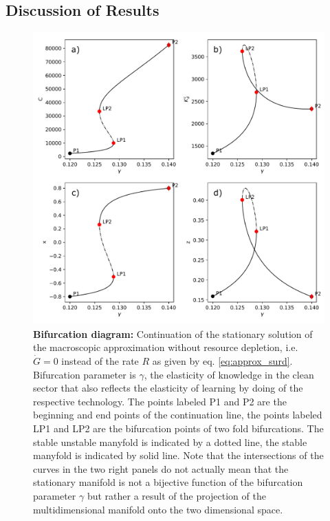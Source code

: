 \subsection{Discussion of Results}

\begin{figure}[ht!]
\centering\includegraphics[width=.95\linewidth]{figures/ba_plot.pdf}
\caption{\textbf{Bifurcation diagram:} Continuation of the stationary solution of the macroscopic approximation without resource depletion, i.e. $\dot{G} = 0$ instead of the rate $R$ as given by eq. \eqref{eq:approx_surd}. Bifurcation parameter is $\gamma$, the elasticity of knowledge in the clean sector that also reflects the elasticity of learning by doing of the respective technology. The points labeled P1 and P2 are the beginning and end points of the continuation line, the points labeled LP1 and LP2 are the bifurcation points of two fold bifurcations. The stable unstable manyfold is indicated by a dotted line, the stable manyfold is indicated by solid line. Note that the intersections of the curves in the two right panels do not actually mean that the stationary manifold is not a bijective function of the bifurcation parameter $\gamma$ but rather a result of the projection of the multidimensional manifold onto the two dimensional space.\label{fig:bifurcation_analysis}}
\end{figure}

